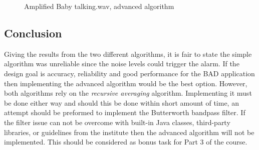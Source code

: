 \begin{figure}[H]
  \centering
  \caption{Amplified Baby talking.wav, advanced algorithm}
  \label{fig:bt_advn_amped}
\end{figure}

\subsection{Conclusion}
Giving the results from the two different algorithms, it is fair to state the
simple algorithm was unreliable since the noise levels could trigger the alarm.
If the design goal is accuracy, reliability and good performance for the BAD
application then implementing the advanced algorithm would be the best option.
However, both algorithms rely on the \emph{recursive averaging} algorithm.
Implementing it must be done either way and should this be done within short
amount of time, an attempt should be preformed to implement the Butterworth
bandpass filter. If the filter issue can not be overcome with built-in Java
classes, third-party libraries, or guidelines from the institute then the
advanced algorithm will not be implemented. This should be considered as bonus
task for Part 3 of the course.
